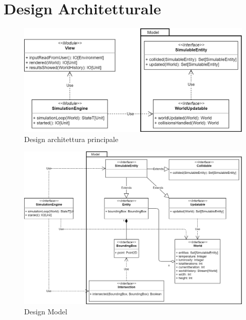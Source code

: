 \section{Design Architetturale}

\begin{figure}[h!]
\centering
\includegraphics[scale=0.44]{img/MainArchitecture.png}
\caption{Design architettura principale}
\label{fig:deathstar}
\end{figure}

\begin{figure}[h!]
\centering
\includegraphics[scale=0.44]{img/Model.png}
\caption{Design Model}
\label{fig:deathstar}
\end{figure}